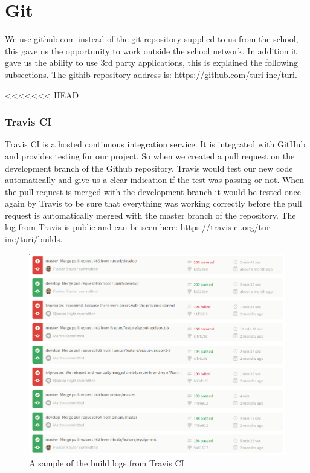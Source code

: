 \documentclass[a4paper]{article}
\begin{document}
\section{Git}
We use github.com instead of the git repository supplied to us from the school, this gave us the opportunity to work outside the school network. In addition it gave us the ability to use 3rd party applications, this is explained the following subsections. The githib repository address is: \url{https://github.com/turi-inc/turi}.

<<<<<<< HEAD
\subsubsection{Travis CI}
Travis CI is a hosted continuous integration service. It is integrated with GitHub and provides testing for our project. So when we created a pull request on the development branch of the Github repository, Travis would test our new code automatically and give us a clear indication if the test was passing or not. When the pull request is merged with the development branch it would be tested once again by Travis to be sure that everything was working correctly before the pull request is automatically merged with the master branch of the repository. The log from Travis is public and can be seen here: \url{https://travis-ci.org/turi-inc/turi/builds}.

\begin{figure}
  \begin{center}
    \includegraphics[scale=0.45]{pictures/Travis_buildlog.png}
    \caption{A sample of the build logs from Travis CI}
    \label{fig:}
  \end{center}
\end{figure}
\end{document}
